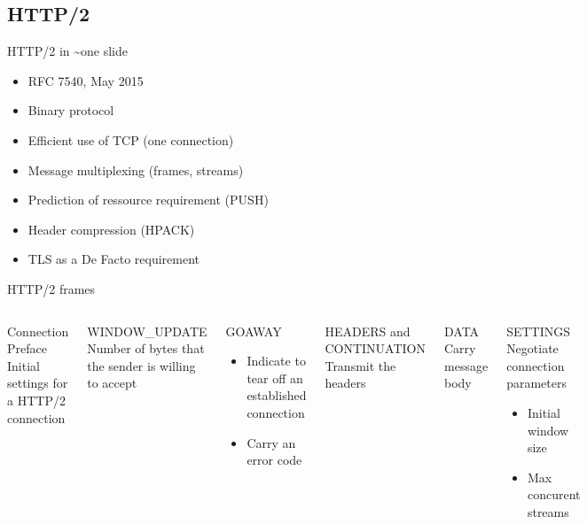 \documentclass{beamer}
\begin{document}
\subsection{HTTP/2}

\begin{frame}{{HTTP/2} in \textasciitilde one slide}
\begin{itemize}
	\item RFC 7540, May 2015
	\item Binary protocol
	\item Efficient use of TCP (one connection)
	\item Message multiplexing (frames, streams)
	\item Prediction of ressource requirement (PUSH)
	\item Header compression (HPACK)
	\item TLS as a De Facto requirement
\end{itemize}
\end{frame}

\begin{frame}{HTTP/2 frames}
\begin{columns}[T,onlytextwidth]
\column{13em}

      \begin{block}{Connection Preface}
        Initial settings for a HTTP/2 connection
      \end{block}

      \begin{block}{WINDOW\_UPDATE}
        Number of bytes that the sender is willing to accept
      \end{block}

      \begin{block}{GOAWAY}
	\begin{itemize}
        	\item Indicate to tear off an established connection
		\item Carry an error code
	\end{itemize}
      \end{block}

\column{13em}
      \begin{block}{HEADERS and CONTINUATION}
        Transmit the headers
      \end{block}

      \begin{block}{DATA}
        Carry message body
	\end{block}

      \begin{block}{SETTINGS}
        Negotiate connection parameters
	\begin{itemize}
		\item Initial window size
		\item Max concurent streams
	\end{itemize}
      \end{block}

\end{columns}
\end{frame}
\end{document}
